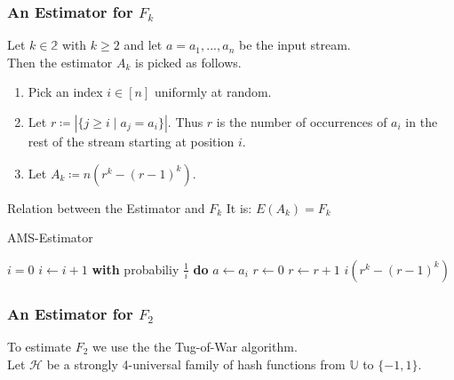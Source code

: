 \documentclass[english]{panikzettel}
\begin{document}
\subsubsection{An Estimator for $F_k$}



\begin{halfboxl}
\vspace{-\baselineskip}
	Let $k\in\mathbb{2}$ with $k\geq 2$ and let $a=a_1,...,a_n$ be the input stream.\\
	Then the estimator $A_k$ is picked as follows.
	\begin{enumerate}
	\item Pick an index $i\in [n]$ uniformly at random.
	\item Let $r\coloneqq |\{j\geq i \mid a_j=a_i \}|$. Thus $r$ is the number of occurrences of $a_i$ in the rest of the stream starting at position $i$.
	\item Let $A_k\coloneqq n(r^k-(r-1)^k)$.
	\end{enumerate}
	\begin{theo}{Relation between the Estimator and $F_k$}
	It is:
	$E(A_k)=F_k$
	\end{theo}
\end{halfboxl}
\begin{halfboxr}
\vspace{-\baselineskip}
	\begin{algo}{AMS-Estimator}
	{
	\renewcommand{\algorithmicrequire}{\textbf{Input:}}
	\renewcommand{\algorithmicensure}{\textbf{Output:}}
	  \begin{algorithmic}[1]
	  \State $i=0$
	    \State $i\leftarrow i+1$
	    \State \textbf{with} probabiliy $\frac{1}{i}$ \textbf{do}
	    \State\hspace{\algorithmicindent} $a\leftarrow a_i$
	    \State\hspace{\algorithmicindent} $r\leftarrow 0$
	      \State $r\leftarrow r+1$
	    \EndIf
	  \EndWhile
	  \State \Return $i(r^k-(r-1)^k)$
	  \end{algorithmic}
	}
	\end{algo}
\end{halfboxr}

\subsubsection{An Estimator for $F_2$}
To estimate $F_2$ we use the the Tug-of-War algorithm.\\
Let $\mathcal{H}$ be a strongly 4-universal family of hash functions from $\mathbb{U}$ to $\{-1,1\}$.
\end{document}
